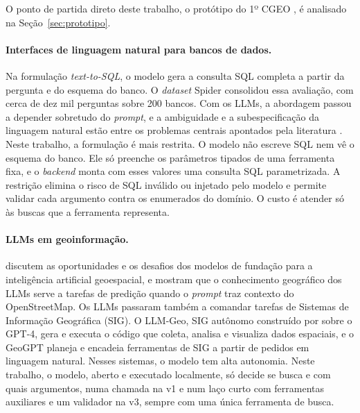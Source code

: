 O ponto de partida direto deste trabalho, o protótipo do 1º CGEO \cite{cgeo2025prototipo}, é analisado na Seção~\ref{sec:prototipo}.

\paragraph{Interfaces de linguagem natural para bancos de dados.} Na formulação \textit{text-to-SQL}, o modelo gera a consulta SQL completa a partir da pergunta e do esquema do banco. O \textit{dataset} Spider \cite{yu2018spider} consolidou essa avaliação, com cerca de dez mil perguntas sobre 200 bancos. Com os LLMs, a abordagem passou a depender sobretudo do \textit{prompt}, e a ambiguidade e a subespecificação da linguagem natural estão entre os problemas centrais apontados pela literatura \cite{liu2025survey}. Neste trabalho, a formulação é mais restrita. O modelo não escreve SQL nem vê o esquema do banco. Ele só preenche os parâmetros tipados de uma ferramenta fixa, e o \textit{backend} monta com esses valores uma consulta SQL parametrizada. A restrição elimina o risco de SQL inválido ou injetado pelo modelo e permite validar cada argumento contra os enumerados do domínio. O custo é atender só às buscas que a ferramenta representa.

\paragraph{LLMs em geoinformação.}  discutem as oportunidades e os desafios dos modelos de fundação para a inteligência artificial geoespacial, e  mostram que o conhecimento geográfico dos LLMs serve a tarefas de predição quando o \textit{prompt} traz contexto do OpenStreetMap. Os LLMs passaram também a comandar tarefas de Sistemas de Informação Geográfica (SIG). O LLM-Geo, SIG autônomo construído por  sobre o GPT-4, gera e executa o código que coleta, analisa e visualiza dados espaciais, e o GeoGPT \cite{zhang2024geogpt} planeja e encadeia ferramentas de SIG a partir de pedidos em linguagem natural. Nesses sistemas, o modelo tem alta autonomia. Neste trabalho, o modelo, aberto e executado localmente, só decide se busca e com quais argumentos, numa chamada na v1 e num laço curto com ferramentas auxiliares e um validador na v3, sempre com uma única ferramenta de busca.

